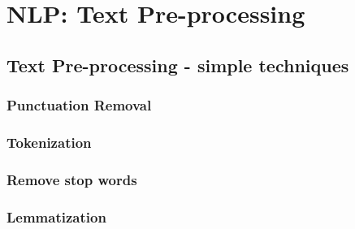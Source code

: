 \chapter{NLP: Text Pre-processing}

\section{Text Pre-processing - simple techniques}
\subsection{Punctuation Removal}\label{nlp-txt-PunctuationRemoval}





\subsection{Tokenization}\label{nlp-txt-Tokenization}



\subsection{Remove stop words}\label{nlp-txt-Remove-stop-words}



\subsection{Lemmatization}\label{nlp-txt-Lemmatization}




